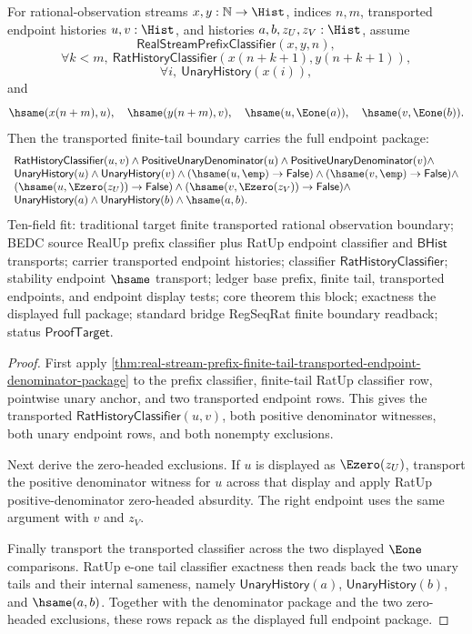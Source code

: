 \begin{theorem}
\label{thm:real-stream-prefix-finite-tail-transported-full-endpoint-package}
For rational-observation streams $x,y:\mathbb{N}\to\Hist$, indices $n,m$,
transported endpoint histories $u,v:\Hist$, and histories
$a,b,z_U,z_V:\Hist$, assume
$$
\mathsf{RealStreamPrefixClassifier}(x,y,n),
$$
$$
\forall k<m,\ \mathsf{RatHistoryClassifier}(x(n+k+1),y(n+k+1)),
$$
$$
\forall i,\ \mathsf{UnaryHistory}(x(i)),
$$
and
$$
\hsame(x(n+m),u),\quad \hsame(y(n+m),v),\quad
\hsame(u,\Eone(a)),\quad \hsame(v,\Eone(b)).
$$
Then the transported finite-tail boundary carries the full endpoint package:
$$
\begin{array}{l}
\mathsf{RatHistoryClassifier}(u,v)\land
\mathsf{PositiveUnaryDenominator}(u)\land
\mathsf{PositiveUnaryDenominator}(v)\land\\
\mathsf{UnaryHistory}(u)\land
\mathsf{UnaryHistory}(v)\land
(\hsame(u,\emp)\to\mathsf{False})\land
(\hsame(v,\emp)\to\mathsf{False})\land\\
(\hsame(u,\Ezero(z_U))\to\mathsf{False})\land
(\hsame(v,\Ezero(z_V))\to\mathsf{False})\land\\
\mathsf{UnaryHistory}(a)\land
\mathsf{UnaryHistory}(b)\land
\hsame(a,b).
\end{array}
$$
Ten-field fit: traditional target finite transported rational observation
boundary; BEDC source RealUp prefix classifier plus RatUp endpoint classifier
and $\mathsf{BHist}$ transports; carrier transported endpoint histories;
classifier $\mathsf{RatHistoryClassifier}$; stability endpoint $\hsame$
transport; ledger base prefix, finite tail, transported endpoints, and endpoint
display tests; core theorem this block; exactness the displayed full package;
standard bridge RegSeqRat finite boundary readback; status
$\mathsf{ProofTarget}$.
\end{theorem}
\begin{proof}
First apply
\autoref{thm:real-stream-prefix-finite-tail-transported-endpoint-denominator-package}
to the prefix classifier, finite-tail RatUp classifier row, pointwise unary
anchor, and two transported endpoint rows. This gives the transported
$\mathsf{RatHistoryClassifier}(u,v)$, both positive denominator witnesses, both
unary endpoint rows, and both nonempty exclusions.

Next derive the zero-headed exclusions. If $u$ is displayed as
$\Ezero(z_U)$, transport the positive denominator witness for $u$ across that
display and apply RatUp positive-denominator zero-headed absurdity. The right
endpoint uses the same argument with $v$ and $z_V$.

Finally transport the transported classifier across the two displayed
$\Eone$ comparisons. RatUp e-one tail classifier exactness then reads back the
two unary tails and their internal sameness, namely
$\mathsf{UnaryHistory}(a)$, $\mathsf{UnaryHistory}(b)$, and $\hsame(a,b)$.
Together with the denominator package and the two zero-headed exclusions, these
rows repack as the displayed full endpoint package.
\end{proof}

